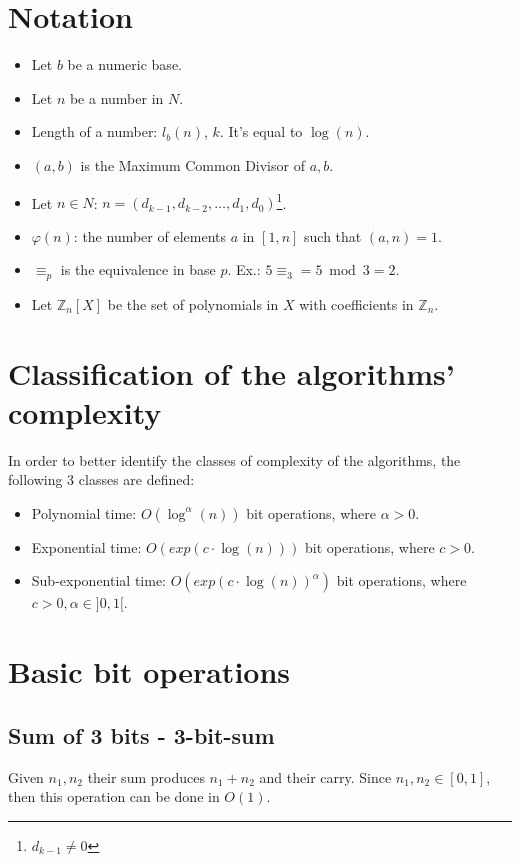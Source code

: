 \section{Notation}
\begin{itemize}
    \item Let $b$ be a numeric base.
    \item Let $n$ be a number in $N$.
    \item Length of a number: $l_{b}(n)$, $k$. It's equal to $\operatorname{log}(n)$.
    \item $(a,b)$ is the Maximum Common Divisor of $a,b$.
    \item Let $n \in N$: $n = (d_{k-1}, d_{k-2}, \dots, d_{1}, d_{0})$\footnote{$d_{k-1} \neq 0$}.
    \item $\varphi(n)$: the number of elements $a$ in $[1,n]$ such that $(a,n) = 1$.
    \item $\equiv_{p}$ is the equivalence in base $p$. Ex.: $5 \equiv_{3} = 5 \bmod 3 = 2 $.
    \item Let $\mathbb{Z}_{n}[X]$ be the set of polynomials in $X$ with coefficients in $\mathbb{Z}_{n}$.
\end{itemize}


\section{Classification of the algorithms' complexity}
In order to better identify the classes of complexity of the algorithms, the following 3 classes are defined:
\begin{itemize}
    \item Polynomial time: $O(\operatorname{log}^{\alpha}(n))$ bit operations, where $\alpha > 0$.
    \item Exponential time: $O(exp(c \cdot \operatorname{log}(n)))$ bit operations, where $c > 0$.
    \item Sub-exponential time: $O(exp(c \cdot \operatorname{log}(n))^{\alpha})$ bit operations, where $c > 0, \alpha \in ]0, 1[$.
\end{itemize}

\section{Basic bit operations}
\subsection{Sum of 3 bits - 3-bit-sum}
Given $n_{1}, n_{2}$ their sum produces $n_{1} + n_{2}$ and their carry. \newline
Since $n_{1}, n_{2} \in [0,1]$, then this operation can be done in $O(1)$.

